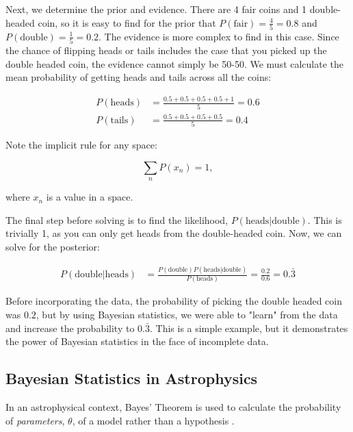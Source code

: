 \documentclass[preprint,longauthor]{aastex631}
\begin{document}
Next, we determine the prior and evidence. There are 4 fair coins and 1 double-headed coin, so it is easy to find for the prior that $P(\text{fair}) = \frac{4}{5} = 0.8$ and $P(\text{double}) = \frac{1}{5} = 0.2$. The evidence is more complex to find in this case. Since the chance of flipping heads or tails includes the case that you picked up the double headed coin, the evidence cannot simply be 50-50. We must calculate the mean probability of getting heads and tails across all the coins:

\begin{align*}
  P(\text{heads}) &= \frac{0.5+0.5+0.5+0.5+1}{5} = 0.6 \\
  P(\text{tails}) &= \frac{0.5+0.5+0.5+0.5}{5} = 0.4
\end{align*}

Note the implicit rule for any space:

\begin{equation}
  \sum_n P(x_n) = 1,
\end{equation}

where $x_n$ is a value in a space.

The final step before solving is to find the likelihood, $P(\text{heads}|\text{double})$. This is trivially 1, as you can only get heads from the double-headed coin. Now, we can solve for the posterior:

\begin{align*}
  P(\text{double}|\text{heads}) &= \frac{P(\text{double})P(\text{heads}|\text{double})}{P(\text{heads})} = \frac{0.2}{0.6} = \boxed{0.\bar{3}}
\end{align*}

Before incorporating the data, the probability of picking the double headed coin was $0.2$, but by using Bayesian statistics, we were able to "learn" from the data and increase the probability to $0.\bar{3}$. This is a simple example, but it demonstrates the power of Bayesian statistics in the face of incomplete data.

\subsection{Bayesian Statistics in Astrophysics}

In an astrophysical context, Bayes' Theorem is used to calculate the probability of \textit{parameters}, $\theta$, of a model rather than a hypothesis \citep{brewer1BayesianInference2018}.

\end{document}

